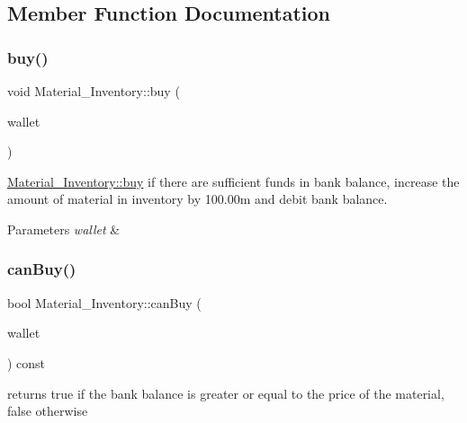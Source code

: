 \subsection{Member Function Documentation}
\mbox{\label{classMaterial__Inventory_a5be24d53377c58ea2391e0f872d199d8}} 
\subsubsection{\texorpdfstring{buy()}{buy()}}
{\footnotesize\ttfamily void Material\+\_\+\+Inventory\+::buy (\begin{DoxyParamCaption}\item[{\hyperlink{classWallet}{Wallet} \&}]{wallet }\end{DoxyParamCaption})}



\hyperlink{classMaterial__Inventory_a5be24d53377c58ea2391e0f872d199d8}{Material\+\_\+\+Inventory\+::buy} if there are sufficient funds in bank balance, increase the amount of material in inventory by 100.\+00m and debit bank balance. 


\begin{DoxyParams}{Parameters}
{\em wallet} & \\
\hline
\end{DoxyParams}
\mbox{\label{classMaterial__Inventory_abb1d889d0af7b79da3b5100a409a5140}} 
\subsubsection{\texorpdfstring{can\+Buy()}{canBuy()}}
{\footnotesize\ttfamily bool Material\+\_\+\+Inventory\+::can\+Buy (\begin{DoxyParamCaption}\item[{\hyperlink{classWallet}{Wallet} \&}]{wallet }\end{DoxyParamCaption}) const}

returns true if the bank balance is greater or equal to the price of the material, false otherwise \mbox{\label{classMaterial__Inventory_a21e999476b95f52063d222ef892887ba}} 
